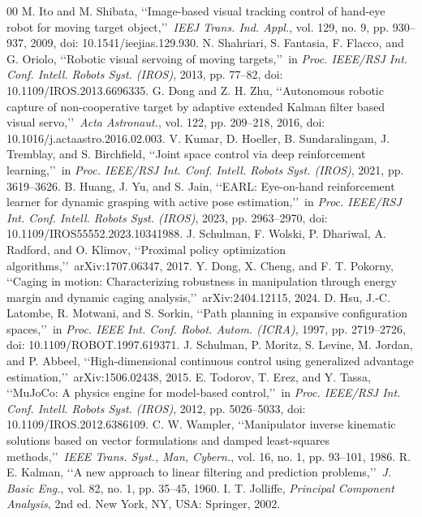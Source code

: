 \documentclass[conference]{IEEEtran}
\newcounter{algorithm}
\begin{document}
\begin{thebibliography}{00}
M. Ito and M. Shibata, \lq\lq Image-based visual tracking control of hand-eye robot for moving target object,\rq\rq\ \emph{IEEJ Trans. Ind. Appl.}, vol. 129, no. 9, pp. 930--937, 2009, doi: 10.1541/ieejias.129.930.
N. Shahriari, S. Fantasia, F. Flacco, and G. Oriolo, \lq\lq Robotic visual servoing of moving targets,\rq\rq\ in \emph{Proc. IEEE/RSJ Int. Conf. Intell. Robots Syst. (IROS)}, 2013, pp. 77--82, doi: 10.1109/IROS.2013.6696335.
G. Dong and Z. H. Zhu, \lq\lq Autonomous robotic capture of non-cooperative target by adaptive extended Kalman filter based visual servo,\rq\rq\ \emph{Acta Astronaut.}, vol. 122, pp. 209--218, 2016, doi: 10.1016/j.actaastro.2016.02.003.
V. Kumar, D. Hoeller, B. Sundaralingam, J. Tremblay, and S. Birchfield, \lq\lq Joint space control via deep reinforcement learning,\rq\rq\ in \emph{Proc. IEEE/RSJ Int. Conf. Intell. Robots Syst. (IROS)}, 2021, pp. 3619--3626.
B. Huang, J. Yu, and S. Jain, \lq\lq EARL: Eye-on-hand reinforcement learner for dynamic grasping with active pose estimation,\rq\rq\ in \emph{Proc. IEEE/RSJ Int. Conf. Intell. Robots Syst. (IROS)}, 2023, pp. 2963--2970, doi: 10.1109/IROS55552.2023.10341988.
J. Schulman, F. Wolski, P. Dhariwal, A. Radford, and O. Klimov, \lq\lq Proximal policy optimization algorithms,\rq\rq\ arXiv:1707.06347, 2017.
Y. Dong, X. Cheng, and F. T. Pokorny, \lq\lq Caging in motion: Characterizing robustness in manipulation through energy margin and dynamic caging analysis,\rq\rq\ arXiv:2404.12115, 2024.
D. Hsu, J.-C. Latombe, R. Motwani, and S. Sorkin, \lq\lq Path planning in expansive configuration spaces,\rq\rq\ in \emph{Proc. IEEE Int. Conf. Robot. Autom. (ICRA)}, 1997, pp. 2719--2726, doi: 10.1109/ROBOT.1997.619371.
J. Schulman, P. Moritz, S. Levine, M. Jordan, and P. Abbeel, \lq\lq High-dimensional continuous control using generalized advantage estimation,\rq\rq\ arXiv:1506.02438, 2015.
E. Todorov, T. Erez, and Y. Tassa, \lq\lq MuJoCo: A physics engine for model-based control,\rq\rq\ in \emph{Proc. IEEE/RSJ Int. Conf. Intell. Robots Syst. (IROS)}, 2012, pp. 5026--5033, doi: 10.1109/IROS.2012.6386109.
C. W. Wampler, \lq\lq Manipulator inverse kinematic solutions based on vector formulations and damped least-squares methods,\rq\rq\ \emph{IEEE Trans. Syst., Man, Cybern.}, vol. 16, no. 1, pp. 93--101, 1986.
R. E. Kalman, \lq\lq A new approach to linear filtering and prediction problems,\rq\rq\ \emph{J. Basic Eng.}, vol. 82, no. 1, pp. 35--45, 1960.
I. T. Jolliffe, \emph{Principal Component Analysis}, 2nd ed. New York, NY, USA: Springer, 2002.
\end{thebibliography}
\end{document}
